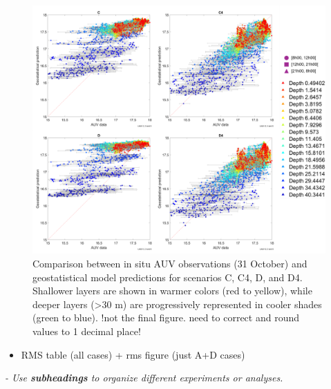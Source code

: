 \begin{figure}[!]
  \centering
  \includegraphics[scale=0.7]{fig/scatter.png}
  \caption{Comparison between in situ AUV observations (31 October) and geostatistical model predictions for scenarios C, C4, D, and D4. Shallower layers are shown in warmer colors (red to yellow), while deeper layers (>30 m) are progressively represented in cooler shades (green to blue). !not the final figure. need to correct and round values to 1 decimal place!}
  \label{fig:scatter}
\end{figure}



\begin{itemize}
    
    \item RMS table (all cases) + rms figure (just A+D cases)
\end{itemize}

 
\textit{- Use \textbf{subheadings} to organize different experiments or analyses.}
